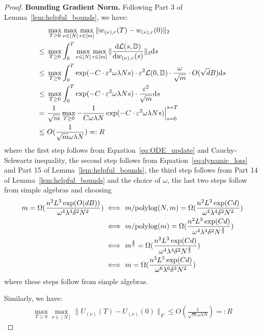 \documentclass[11pt]{article}
\theoremstyle{plain}
\renewcommand{\d}{\mathrm{d}}
\begin{document}
\begin{proof}
    {\bf Bounding Gradient Norm.}
    Following Part 3 of Lemma~\ref{lem:helpful_bounds}, we have:
    \begin{align}\label{eq:choice_m}
        & ~ \max_{T \ge 0} \max_{\nu\in [N]} \max_{r \in [m]} \| w_{(\nu), r}(T) -  w_{(\nu), r}(0) \|_2 \notag \\
        \leq & ~  \max_{T \ge 0} \int_{0}^T \max_{\nu\in [N]}\max_{r \in [m]}\| \frac{\d {\cal L}(s, \mathbb{D})}{\d w_{(\nu), r}(s)} \|_2 \d s \notag\\
        \leq & ~ \max_{T \ge 0} \int_{0}^T \exp(- C \cdot \varepsilon^2 \omega \lambda Ns) \cdot \varepsilon^2 {\cal L}(0, \mathbb{D}) \cdot \frac{\omega}{\sqrt{m}} \cdot O(\sqrt{d}B)  \d s \notag\\
        \leq & ~ \max_{T \ge 0} \int_{0}^T \exp(- C \cdot \varepsilon^2 \omega\lambda Ns) \cdot \frac{\varepsilon^2}{\sqrt{m}}  \d s \notag\\
        = & ~ \frac{1}{\sqrt{m}} \max_{T \ge 0} - \frac{1}{C \omega \lambda N} \exp(- C \cdot \varepsilon^2 \omega \lambda Ns) \Big|_{s=0}^{s=T}  \notag\\
        \leq & ~ O(\frac{1}{\sqrt{m}  \omega\lambda N}) =: R
    \end{align}
    where the first step follows from Equation~\eqref{eq:ODE_update} and Cauchy-Schwartz inequality, the second step follows from Equation~\eqref{eq:dynamic_loss} and Part 15 of Lemma~\ref{lem:helpful_bounds}, the third step follows from Part 14 of Lemma~\ref{lem:helpful_bounds} and the choice of $\omega$, the last two steps follow from simple algebras and choosing
    \begin{align*}
        m = \Omega(\frac{n^2L^3\exp(O(dB))}{\omega^4\lambda^4\delta^2 N^2})
        \iff & ~ m/{\rm polylog}(N, m) = \Omega(\frac{n^2L^3\exp(Cd)}{\omega^4\lambda^4\delta^2 N^2}) \\
        \iff & ~ m/{\rm polylog}(m) = \Omega(\frac{n^2L^3\exp(Cd)}{\omega^4\lambda^4\delta^2 N^{\frac{4}{3}}}) \\
        \iff & ~ m^{\frac{2}{3}} = \Omega(\frac{n^2L^3\exp(Cd)}{\omega^4\lambda^4\delta^2 N^{\frac{4}{3}}}) \\
        \iff & ~ m = \Omega(\frac{n^3L^5\exp(Cd)}{\omega^6\lambda^6\delta^3 N^{2}})
    \end{align*}
    where these steps follow from simple algebras.

    Similarly, we have:
    \begin{align*}
        \max_{T \ge 0} \max_{\nu\in [N]}  \| U_{(\nu)}(T) -  U_{(\nu)}(0) \|_F \leq O(\frac{1}{\sqrt{m}  \omega\lambda N}) =: R
    \end{align*}


\end{proof}
\end{document}
